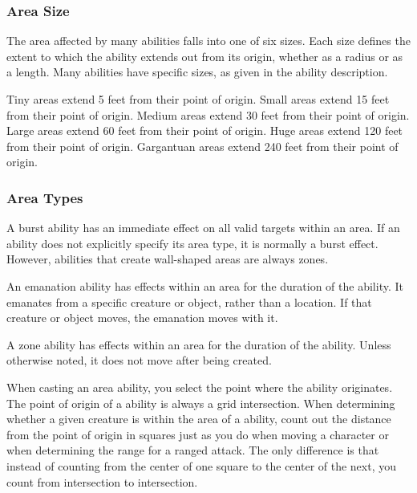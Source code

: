         \subsubsection{Area Size}

            The area affected by many abilities falls into one of six sizes.
            Each size defines the extent to which the ability extends out from its origin, whether as a radius or as a length.
            Many abilities have specific sizes, as given in the ability description.

             Tiny areas extend 5 feet from their point of origin.
             Small areas extend 15 feet from their point of origin.
             Medium areas extend 30 feet from their point of origin.
             Large areas extend 60 feet from their point of origin.
             Huge areas extend 120 feet from their point of origin.
             Gargantuan areas extend 240 feet from their point of origin.

        \subsubsection{Area Types}\label{Area Types}

             A burst ability has an immediate effect on all valid targets within an area.
            If an ability does not explicitly specify its area type, it is normally a burst effect.
            However, abilities that create wall-shaped areas are always zones.

             An emanation ability has effects within an area for the duration of the ability.
            It emanates from a specific creature or object, rather than a location.
            If that creature or object moves, the emanation moves with it.

             A zone ability has effects within an area for the duration of the ability.
            Unless otherwise noted, it does not move after being created.

            When casting an area ability, you select the point where the ability originates.
            The point of origin of a ability is always a grid intersection.
            When determining whether a given creature is within the area of a ability, count out the distance from the point of origin in squares just as you do when moving a character or when determining the range for a ranged attack.
            The only difference is that instead of counting from the center of one square to the center of the next, you count from intersection to intersection.

